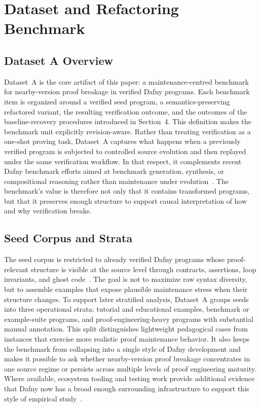 \section{Dataset and Refactoring Benchmark}

\subsection{Dataset A Overview}

Dataset~A is the core artifact of this paper: a maintenance-centred benchmark for nearby-version proof breakage in verified Dafny programs. Each benchmark item is organized around a verified seed program, a semantics-preserving refactored variant, the resulting verification outcome, and the outcomes of the baseline-recovery procedures introduced in Section~4. This definition makes the benchmark unit explicitly revision-aware. Rather than treating verification as a one-shot proving task, Dataset~A captures what happens when a previously verified program is subjected to controlled source evolution and then replayed under the same verification workflow. In that respect, it complements recent Dafny benchmark efforts aimed at benchmark generation, synthesis, or compositional reasoning rather than maintenance under evolution~\cite{DafnyBench2024,Xu2026DafnyComp,Wang2026TACoDafny}. The benchmark's value is therefore not only that it contains transformed programs, but that it preserves enough structure to support causal interpretation of how and why verification breaks.

\subsection{Seed Corpus and Strata}

The seed corpus is restricted to already verified Dafny programs whose proof-relevant structure is visible at the source level through contracts, assertions, loop invariants, and ghost code~\cite{Leino2010Dafny,Grov2016VerificationPatternsDafny}. The goal is not to maximize raw syntax diversity, but to assemble examples that expose plausible maintenance stress when their structure changes. To support later stratified analysis, Dataset~A groups seeds into three operational strata: tutorial and educational examples, benchmark or example-suite programs, and proof-engineering-heavy programs with substantial manual annotation. This split distinguishes lightweight pedagogical cases from instances that exercise more realistic proof maintenance behavior. It also keeps the benchmark from collapsing into a single style of Dafny development and makes it possible to ask whether nearby-version proof breakage concentrates in one source regime or persists across multiple levels of proof engineering maturity. Where available, ecosystem tooling and testing work provide additional evidence that Dafny now has a broad enough surrounding infrastructure to support this style of empirical study~\cite{Irfan2022TestingDafny,Fedchin2023ToolkitTestingDafny}.


